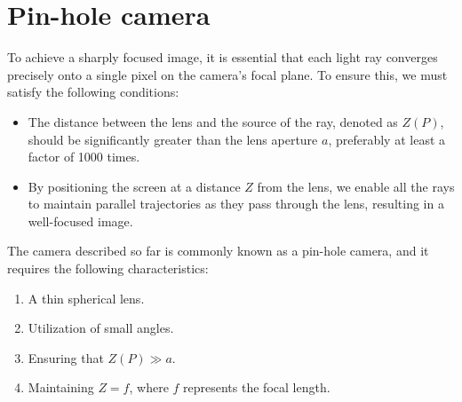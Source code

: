 \documentclass[12pt, a4paper]{report}
\begin{document}
    \section{Pin-hole camera}
    To achieve a sharply focused image, it is essential that each light ray converges precisely onto a single pixel on the camera's focal plane. 
    To ensure this, we must satisfy the following conditions:
    \begin{itemize}
        \item The distance between the lens and the source of the ray, denoted as $Z(P)$, should be significantly greater than the lens aperture $a$, preferably at least a factor of 1000 times.
        \item By positioning the screen at a distance $Z$ from the lens, we enable all the rays to maintain parallel trajectories as they pass through the lens, resulting in a well-focused image.
    \end{itemize}
    The camera described so far is commonly known as a pin-hole camera, and it requires the following characteristics:
    \begin{enumerate}
        \item A thin spherical lens.
        \item Utilization of small angles.
        \item Ensuring that $Z(P) \gg a$.
        \item Maintaining $Z=f$, where $f$ represents the focal length.
    \end{enumerate}
\end{document}
